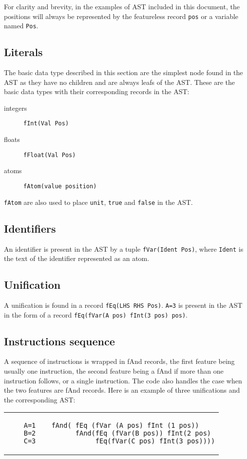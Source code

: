 \documentclass[a4paper]{memoir}
\begin{document}
For clarity and brevity, in the examples of AST included in this document, the
positions will always be represented by the featureless record \lstinline!pos!
or a variable named \lstinline!Pos!. 
\subsection{Literals}
The basic data type described in this section are the simplest node found in the AST as they have no children and are always leafs of the AST.
These are the basic data types with their corresponding records in the AST:
\begin{description}
  \item[integers] \lstinline!fInt(Val Pos)!
  \item[floats] \lstinline!fFloat(Val Pos)!
  \item[atoms] \lstinline!fAtom(value position)!
\end{description}

\lstinline!fAtom! are also used to place \lstinline!unit!, \lstinline!true! and
\lstinline!false! in the AST.

\subsection{Identifiers}\label{sec:input:identifiers}
An identifier is present in the AST by a tuple \lstinline!fVar(Ident Pos)!,
where \lstinline!Ident! is the text of the identifier represented as an atom.

\subsection{Unification}
A unification is found in a record \lstinline!fEq(LHS RHS Pos)!.
\lstinline!A=3! is present in the AST in the form of a record
\lstinline!fEq(fVar(A pos) fInt(3 pos) pos)!.

\subsection{Instructions sequence}
A sequence of instructions is wrapped in fAnd records, the first feature being usually one instruction, the second feature being a fAnd if more than one instruction follows,  or a single instruction. The code also handles the case when the two features are fAnd records. %
Here is an example of three unifications and the corresponding AST:\\
\begin{tabular}{ p{} p{} }
  \begin{lstlisting}
    A=1
    B=2
    C=3
  \end{lstlisting}
&
  \footnotesize{
  \begin{lstlisting}
  fAnd( fEq (fVar (A pos) fInt (1 pos))
        fAnd(fEq (fVar(B pos)) fInt(2 pos) 
             fEq(fVar(C pos) fInt(3 pos))))
  \end{lstlisting}
  }
\end{tabular}
\end{document}
